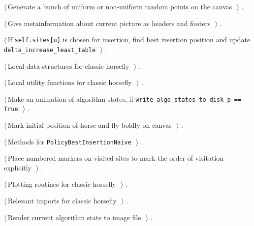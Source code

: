 \documentclass[11.5pt]{report}
\begin{document}
{\begin{list}{}{\setlength{\itemsep}{-\parsep}\setlength{\itemindent}{-\leftmargin}}
\item $\langle\,$Generate a bunch of uniform or non-uniform random points on the canvas\nobreak\ {\footnotesize {}}$\,\rangle$ {\footnotesize {\NWtxtRefIn} .}
\item $\langle\,$Give metainformation about current picture as headers and footers\nobreak\ {\footnotesize {}}$\,\rangle$ {\footnotesize {\NWtxtRefIn} .}
\item $\langle\,$If \texttt{self.sites[u]} is chosen for insertion, find best insertion position and update \texttt{delta\_increase\_least\_table}\nobreak\ {\footnotesize {}}$\,\rangle$ {\footnotesize {\NWtxtRefIn} .}
\item $\langle\,$Local data-structures for classic horsefly\nobreak\ {\footnotesize {}}$\,\rangle$ {\footnotesize {\NWtxtRefIn} .}
\item $\langle\,$Local utility functions for classic horsefly\nobreak\ {\footnotesize {}}$\,\rangle$ {\footnotesize {\NWtxtRefIn} .}
\item $\langle\,$Make an animation of algorithm states, if \verb|write_algo_states_to_disk_p == True|\nobreak\ {\footnotesize {}}$\,\rangle$ {\footnotesize {\NWtxtRefIn} .}
\item $\langle\,$Mark initial position of horse and fly boldly on canvas\nobreak\ {\footnotesize {}}$\,\rangle$ {\footnotesize {\NWtxtRefIn} .}
\item $\langle\,$Methods for \verb|PolicyBestInsertionNaive|\nobreak\ {\footnotesize {}}$\,\rangle$ {\footnotesize {\NWtxtRefIn} .}
\item $\langle\,$Place numbered markers on visited sites to mark the order of visitation explicitly\nobreak\ {\footnotesize {}}$\,\rangle$ {\footnotesize {\NWtxtRefIn} .}
\item $\langle\,$Plotting routines for classic horsefly\nobreak\ {\footnotesize {}}$\,\rangle$ {\footnotesize {\NWtxtRefIn} .}
\item $\langle\,$Relevant imports for classic horsefly\nobreak\ {\footnotesize {}}$\,\rangle$ {\footnotesize {\NWtxtRefIn} .}
\item $\langle\,$Render current algorithm state to image file\nobreak\ {\footnotesize {}}$\,\rangle$ {\footnotesize {\NWtxtRefIn} .}

\end{list}}
\end{document}
